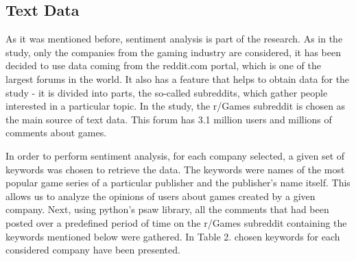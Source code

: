 \documentclass[review]{elsarticle} %
\begin{document}
\subsection{Text Data}
As it was mentioned before, sentiment analysis is part of the research. As in the study, only the companies from the gaming industry are considered, it has been decided to use data coming from the reddit.com portal, which is one of the largest forums in the world. It also has a feature that helps to obtain data for the study - it is divided into parts, the so-called subreddits, which gather people interested in a particular topic. In the study, the r/Games subreddit is chosen as the main source of text data. This forum has 3.1 million users and millions of comments about games. 

In order to perform sentiment analysis, for each company selected, a given set of keywords was chosen to retrieve the data. The keywords were names of the most popular game series of a particular publisher and the publisher's name itself. This allows us to analyze the opinions of users about games created by a given company. Next, using python's psaw library,  all the comments that had been posted over a predefined period of time on the r/Games subreddit containing the keywords mentioned below were gathered. In Table 2. chosen keywords for each considered company have been presented. 
\end{document}

